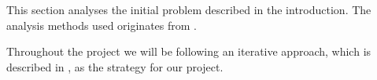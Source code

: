 This section analyses the initial problem described in the introduction. The analysis methods used originates from \cite{mathiassen2001objektorienteret}. 

Throughout the project we will be following an iterative approach, which is described in \cite{mathiassen2001objektorienteret}, as the strategy for our project.